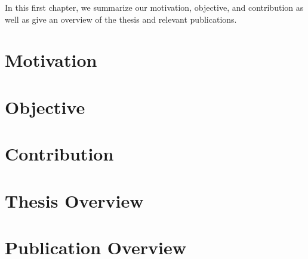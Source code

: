 In this first chapter, we summarize our motivation, objective, and contribution
as well as give an overview of the thesis and relevant publications.

\section{Motivation}

\section{Objective}

\section{Contribution}

\section{Thesis Overview}

\section{Publication Overview}
